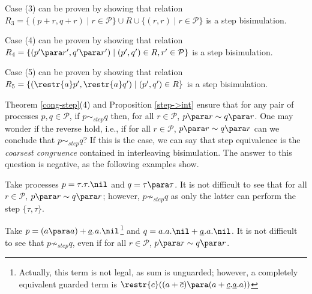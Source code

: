 \begin{theorem}
Case (3) can be proven by showing that relation $R_3 = \{(p + r, q + r) \mid 
r \in \mathcal{P}\} \cup R \cup \{(r, r) \mid r \in \mathcal{P}\}$ is a step bisimulation.

Case (4) can be proven by showing that relation $R_4 =  \{(p' \para r', q' \para r') \mid (p', q') \in R, r' \in \mathcal{P}\}$ 
 is a step bisimulation. 

Case (5) can be proven by showing that relation $R_5 =  \{(\restr{a}p', \restr{a}q') \mid (p', q') \in R\}$
 is a step bisimulation.
\fine
\end{theorem}


Theorem \ref{cong-step}(4) and Proposition \ref{step->int} ensure that 
for any pair of processes $p, q \in \mathcal{P}$, if $p \sim_{step} q$ then,  for all  $r \in \mathcal{P}$, $p \para r \sim q \para r$.
One may wonder if the reverse hold, i.e., if for all  $r \in \mathcal{P}$, $p \para r \sim q \para r$ can we conclude that 
$p \sim_{step} q$? If this is the case, we can say that step equivalence is the {\em coarsest congruence} contained in
interleaving bisimulation. The answer to this question is negative, as the following examples show.

\begin{example}\label{no-tau-coarsest}
Take processes $p = \tau.\tau.\nil$ and $q = \tau \para \tau$.
It is not difficult to see that for all  $r \in \mathcal{P}$, $p \para r \sim q \para r$; however, $p \not\sim_{step} q$ 
as only the latter can perform the step $\{\tau, \tau\}$. 
\fine
\end{example}

\begin{example}\label{no-coarsest}
Take $p = (a \para a) + \underline{a}.a.\nil$\footnote{Actually, this term is not legal, as sum is unguarded; however, 
a completely equivalent guarded term is $\restr{c}((a + \overline{c}) \para (a + \underline{c}.\underline{a}.a))$} 
and $q = a.a.\nil + \underline{a}.a.\nil$. It is not difficult to see that $p \not\sim_{step} q$, even if
for all  $r \in \mathcal{P}$, $p \para r \sim q \para r$.
\fine
\end{example}







